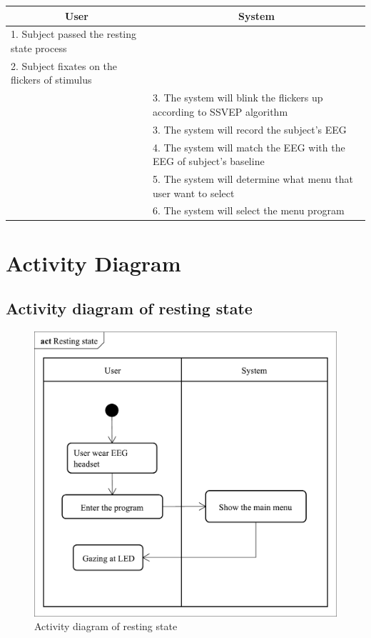 \begin{itemize}
\begin{description}
{\begin{tabular}{| m{.47\linewidth} | m{.47\linewidth} |}
			\hline 
			\multicolumn{1}{|c}{\textbf{User}} & 
  			\multicolumn{1}{|c|}{\textbf{System}}\\
			\hline 
			1. Subject passed the resting state process &   \\
			\hline 
			2. Subject fixates on the flickers of stimulus   &   \\
            \hline 
			& 3. The system will blink the flickers up according to SSVEP algorithm \\
			\hline 
			& 3. The system will record the subject’s EEG \\
			\hline 
			& 4. The system will match the EEG with the EEG of subject’s baseline  \\
			\hline
			& 5. The system will determine what menu that user want to select \\
			\hline
			& 6. The system will select the menu program\\
			\hline
			
		\end{tabular}
	}
	
\end{description}
\end{itemize}


\section{Activity Diagram}


\subsection{Activity diagram of resting state}

\begin{figure}[ht]
\centering \includegraphics[scale=0.295]{chapter4/Rest.pdf}
\caption{Activity diagram of resting state}
\end{figure}



